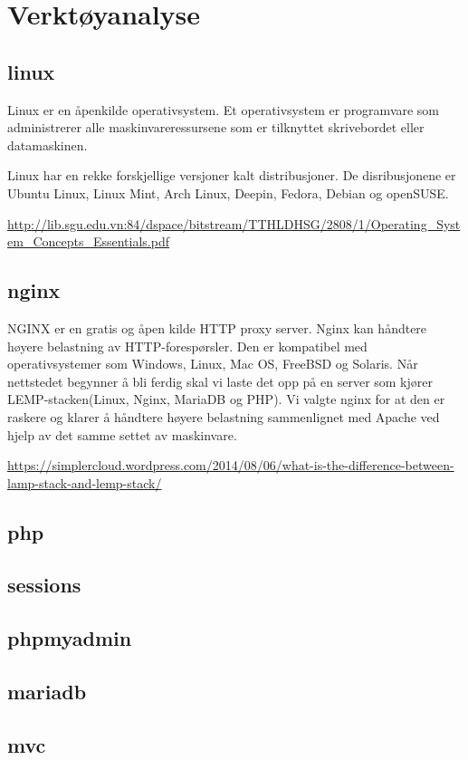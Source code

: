 \clearpage

\section{Verktøyanalyse}


\subsection{linux}
Linux er en åpenkilde operativsystem. Et operativsystem er programvare som administrerer alle maskinvareressursene som er tilknyttet skrivebordet eller datamaskinen. 

Linux har en rekke forskjellige versjoner kalt distribusjoner. De disribusjonene er Ubuntu Linux, Linux Mint, Arch Linux, Deepin, Fedora, Debian og openSUSE.

\url{http://lib.sgu.edu.vn:84/dspace/bitstream/TTHLDHSG/2808/1/Operating_System_Concepts_Essentials.pdf}

\subsection{nginx}
NGINX er en gratis og åpen kilde HTTP proxy server. Nginx kan håndtere høyere belastning av HTTP-forespørsler. Den er kompatibel med operativsystemer som Windows, Linux, Mac OS, FreeBSD og Solaris.
Når nettstedet begynner å bli ferdig skal vi laste det opp på en server som kjører LEMP-stacken(Linux, Nginx, MariaDB og PHP).
Vi valgte nginx for at den er raskere og klarer å håndtere høyere belastning sammenlignet med Apache ved hjelp av det samme settet av maskinvare.

\url{https://simplercloud.wordpress.com/2014/08/06/what-is-the-difference-between-lamp-stack-and-lemp-stack/}


\subsection{php}
\subsection{sessions}
\subsection{phpmyadmin}
\subsection{mariadb}
\subsection{mvc}
